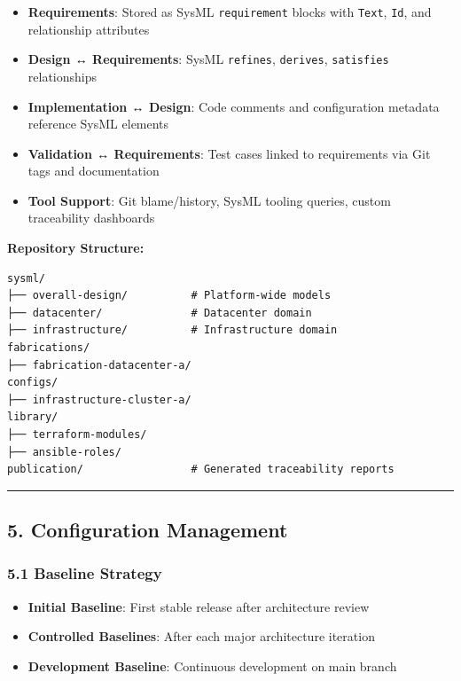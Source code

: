 \documentclass[12pt]{article}
\providecommand{\tightlist}{%
  \setlength{\itemsep}{0pt}\setlength{\parskip}{0pt}}
\begin{document}
\begin{itemize}
\tightlist
\item
  \textbf{Requirements}: Stored as SysML \texttt{requirement} blocks
  with \texttt{Text}, \texttt{Id}, and relationship attributes
\item
  \textbf{Design ↔ Requirements}: SysML \texttt{refines},
  \texttt{derives}, \texttt{satisfies} relationships
\item
  \textbf{Implementation ↔ Design}: Code comments and configuration
  metadata reference SysML elements
\item
  \textbf{Validation ↔ Requirements}: Test cases linked to requirements
  via Git tags and documentation
\item
  \textbf{Tool Support}: Git blame/history, SysML tooling queries,
  custom traceability dashboards
\end{itemize}

\textbf{Repository Structure:}

\begin{verbatim}
sysml/
├── overall-design/          # Platform-wide models
├── datacenter/              # Datacenter domain
├── infrastructure/          # Infrastructure domain
fabrications/
├── fabrication-datacenter-a/
configs/
├── infrastructure-cluster-a/
library/
├── terraform-modules/
├── ansible-roles/
publication/                 # Generated traceability reports
\end{verbatim}

\begin{center}\rule{0.5\linewidth}{0.5pt}\end{center}

\subsection{5. Configuration Management}\label{configuration-management}

\subsubsection{5.1 Baseline Strategy}\label{baseline-strategy}

\begin{itemize}
\tightlist
\item
  \textbf{Initial Baseline}: First stable release after architecture
  review
\item
  \textbf{Controlled Baselines}: After each major architecture iteration
\item
  \textbf{Development Baseline}: Continuous development on main branch
\end{itemize}
\end{document}

